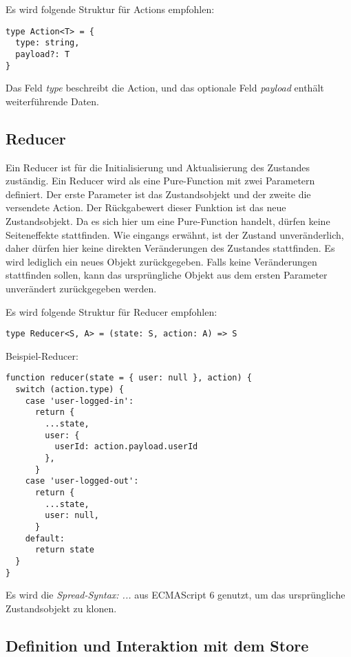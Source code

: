 Es wird folgende Struktur für Actions empfohlen:
\begin{lstlisting}
type Action<T> = {
  type: string,
  payload?: T
}
\end{lstlisting}

Das Feld \textit{type} beschreibt die Action, und das optionale Feld \textit{payload} enthält weiterführende Daten.

\subsection{Reducer}

Ein Reducer ist für die Initialisierung und Aktualisierung des Zustandes zuständig. Ein Reducer wird als eine Pure-Function mit zwei Parametern definiert.
Der erste Parameter ist das Zustandsobjekt und der zweite die versendete Action. Der Rückgabewert dieser Funktion ist das neue Zustandsobjekt. Da es sich hier um eine Pure-Function handelt, dürfen keine Seiteneffekte stattfinden. Wie eingangs erwähnt, ist der Zustand unveränderlich, daher dürfen hier keine direkten Veränderungen des Zustandes stattfinden. Es wird lediglich ein neues Objekt zurückgegeben. Falls keine Veränderungen stattfinden sollen, kann das ursprüngliche Objekt aus dem ersten Parameter unverändert zurückgegeben werden.\cite{reduxStateActionReducers}

Es wird folgende Struktur für Reducer empfohlen:
\begin{lstlisting}
type Reducer<S, A> = (state: S, action: A) => S
\end{lstlisting}

Beispiel-Reducer:

\begin{lstlisting}
function reducer(state = { user: null }, action) {
  switch (action.type) {
    case 'user-logged-in':
      return {
        ...state,
        user: {
          userId: action.payload.userId
        },
      }
    case 'user-logged-out':
      return {
        ...state,
        user: null,
      }
    default:
      return state
  }
}
\end{lstlisting}

Es wird die \textit{Spread-Syntax: ...} aus ECMAScript 6 genutzt, um das ursprüngliche Zustandsobjekt zu klonen.\cite{mdnSpreadSyntax}

\subsection{Definition und Interaktion mit dem Store}

